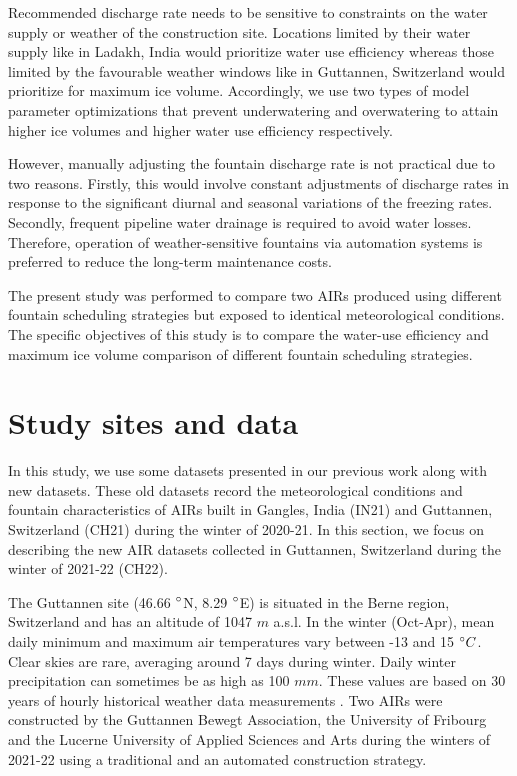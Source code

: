 \documentclass[tc, manuscript]{copernicus}
\begin{document}
Recommended discharge rate needs to be sensitive to constraints on the water supply or weather of the
construction site. Locations limited by their water supply like in Ladakh, India would prioritize water use
efficiency whereas those limited by the favourable weather windows like in Guttannen, Switzerland  would
prioritize for maximum ice volume.  Accordingly, we use two types of model parameter optimizations that prevent
underwatering and overwatering to attain higher ice volumes and higher water use efficiency respectively.

However, manually adjusting the fountain discharge rate is not practical due to two reasons. Firstly, this would
involve constant adjustments of discharge rates in response to the significant diurnal and seasonal variations
of the freezing rates. Secondly, frequent pipeline water drainage is required to avoid water losses. Therefore,
operation of weather-sensitive fountains via automation systems is preferred to reduce the long-term maintenance
costs.

The present study was performed to compare two AIRs produced using different fountain scheduling strategies but
exposed to identical meteorological conditions. The specific objectives of this study is to compare the
water-use efficiency and maximum ice volume comparison of different fountain scheduling strategies.

\section{Study sites and data}

In this study, we use some datasets presented in our previous work
\citep{balasubramanianInfluenceMeteorologicalConditions2022} along with new datasets. These old datasets record
the meteorological conditions and fountain characteristics of AIRs built in Gangles, India (IN21) and Guttannen,
Switzerland (CH21) during the winter of 2020-21. In this section, we focus on describing the new AIR datasets
collected in Guttannen, Switzerland during the winter of 2021-22 (CH22).

The Guttannen site (46.66 $^{\circ}$N, 8.29 $^{\circ}$E) is situated in the Berne region, Switzerland and has an
altitude of 1047 $m$ a.s.l. In the winter (Oct-Apr), mean daily minimum and maximum air temperatures vary
between -13 and 15 $^{\circ} C$. Clear skies are rare, averaging around 7 days during winter. Daily winter
precipitation can sometimes be as high as 100 $mm$. These values are based on 30 years of hourly historical
weather data measurements \citep{meteoblueClimateGuttannen2021}. Two AIRs were constructed by the Guttannen
Bewegt Association, the University of Fribourg and the Lucerne University of Applied Sciences and Arts during
the winters of 2021-22 using a traditional and an automated construction strategy.
\end{document}
